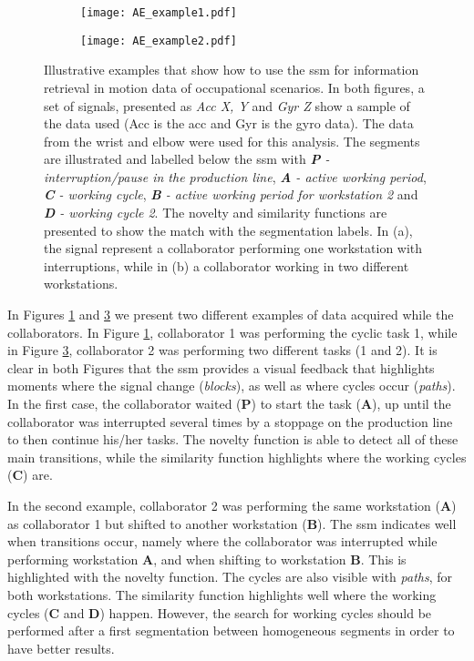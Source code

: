 \begin{figure}
 \begin{subfigure}{0.45\linewidth}
      \texttt{[image: AE\_example1.pdf]}
  \caption{}
  \label{fig:ae_example1}
 \end{subfigure}
 \begin{subfigure}{0.45\linewidth}
      \texttt{[image: AE\_example2.pdf]}
  \caption{}
  \label{fig:ae_example2}
  \end{subfigure}
\caption{Illustrative examples that show how to use the \gls{ssm} for information retrieval in motion data of occupational scenarios. In both figures, a set of signals, presented as \textit{Acc X, Y} and \textit{Gyr Z} show a sample of the data used (Acc is the \gls{acc} and Gyr is the \gls{gyro} data). The data from the wrist and elbow were used for this analysis. The segments are illustrated and labelled below the \gls{ssm} with \textit{\textbf{P} - interruption/pause in the production line}, \textit{\textbf{A} - active working period}, \textit{\textbf{C} - working cycle}, \textit{\textbf{B} - active working period for workstation 2} and \textit{\textbf{D} - working cycle 2}. The novelty and similarity functions are presented to show the match with the segmentation labels. In (a), the signal represent a collaborator performing one workstation with interruptions, while in (b) a collaborator working in two different workstations.}
\end{figure}

In Figures \ref{fig:ae_example1} and \ref{fig:ae_example2} we present two different examples of data acquired while the collaborators. In Figure \ref{fig:ae_example1}, collaborator 1 was performing the cyclic task 1, while in Figure \ref{fig:ae_example2}, collaborator 2 was performing two different tasks (1 and 2). It is clear in both Figures that the \gls{ssm} provides a visual feedback that highlights moments where the signal change (\textit{blocks}), as well as where cycles occur (\textit{paths}). In the first case, the collaborator waited (\textbf{P}) to start the task (\textbf{A}), up until the collaborator was interrupted several times by a stoppage on the production line to then continue his/her tasks. The novelty function is able to detect all of these main transitions, while the similarity function highlights where the working cycles (\textbf{C}) are.

In the second example, collaborator 2 was performing the same workstation  (\textbf{A}) as collaborator 1 but shifted to another workstation (\textbf{B}). The \gls{ssm} indicates well when transitions occur, namely where the collaborator was interrupted while performing workstation \textbf{A}, and when shifting to workstation \textbf{B}. This is highlighted with the novelty function. The cycles are also visible with \textit{paths}, for both workstations. The similarity function highlights well where the working cycles (\textbf{C} and \textbf{D}) happen. However, the search for working cycles should be performed after a first segmentation between homogeneous segments in order to have better results. 

